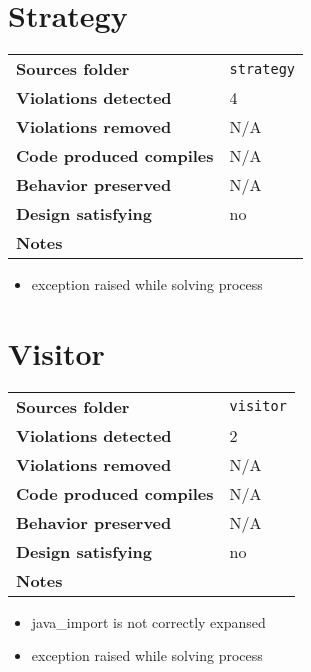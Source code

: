 \documentclass[french]{article}
\begin{document}
\section*{Strategy}
\noindent\begin{tabular}{ l p{12cm} }
\textbf{Sources folder} &  \texttt{strategy}\\
\textbf{Violations detected} & 4\\
\textbf{Violations removed} & N/A\\
\textbf{Code produced compiles} & N/A\\
\textbf{Behavior preserved} & N/A\\
\textbf{Design satisfying} & no\\
\textbf{Notes} & \\
\end{tabular}
\begin{itemize}
\item exception raised while solving process
\end{itemize}

\section*{Visitor}
\noindent\begin{tabular}{ l p{12cm} }
\textbf{Sources folder} &  \texttt{visitor}\\
\textbf{Violations detected} & 2\\
\textbf{Violations removed} & N/A\\
\textbf{Code produced compiles} & N/A\\
\textbf{Behavior preserved} & N/A\\
\textbf{Design satisfying} & no\\
\textbf{Notes} & \\
\end{tabular}
\begin{itemize}
\item java\_import is not correctly expansed
\item exception raised while solving process
\end{itemize}
\end{document}
